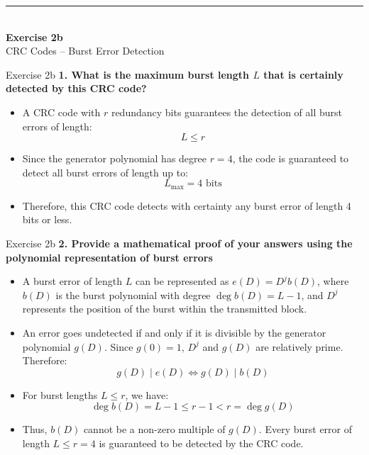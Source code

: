 \documentclass[10pt, aspectratio=169]{beamer}
\newcommand{\question}[1]{{\color{QuestionRed}\textbf{#1}}}
\begin{document}
\begin{frame}[plain]
  \vfill
  \centering
  {\color{TealAccent}\rule{2cm}{2pt}}\\[0.4cm]
  {\LARGE\bfseries\color{NavyPrimary} Exercise 2b}\\[0.2cm]
  {\large\color{SlateNeutral} CRC Codes -- Burst Error Detection}
  \vfill
\end{frame}

\begin{frame}{Exercise 2b}
  \question{1. What is the maximum burst length $L$ that is certainly detected by this CRC code?}

  \vspace{0.25cm}
  \begin{itemize}
    \item A CRC code with $r$ redundancy bits guarantees the detection of all burst errors of length:
    \[
      L \le r
    \]
    \item Since the generator polynomial has degree $r = 4$, the code is guaranteed to detect all burst errors of length up to:
    \[
      L_{\max} = 4\text{ bits}
    \]
    \item Therefore, this CRC code detects with certainty any burst error of length 4 bits or less.
  \end{itemize}
\end{frame}

\begin{frame}{Exercise 2b}
  \question{2. Provide a mathematical proof of your answers using the polynomial representation of burst errors}

  \vspace{0.15cm}
  \small
  \begin{itemize}
    \item A burst error of length $L$ can be represented as $e(D) = D^j b(D)$, where $b(D)$ is the burst polynomial with degree $\deg b(D) = L - 1$, and $D^j$ represents the position of the burst within the transmitted block.
    \item An error goes undetected if and only if it is divisible by the generator polynomial $g(D)$. Since $g(0) = 1$, $D^j$ and $g(D)$ are relatively prime. Therefore:
    \[
      g(D) \mid e(D) \iff g(D) \mid b(D)
    \]
    \item For burst lengths $L \le r$, we have:
    \[
      \deg b(D) = L - 1 \le r - 1 < r = \deg g(D)
    \]
    \item Thus, $b(D)$ cannot be a non-zero multiple of $g(D)$. Every burst error of length $L \le r = 4$ is guaranteed to be detected by the CRC code.
  \end{itemize}
\end{frame}
\end{document}
